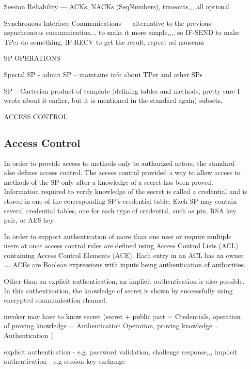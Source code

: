 \documentclass[
  digital, %
  oneside, %
  nolof,     %
  nolot,     %
]{fithesis4}
\begin{document}
Session Reliability --- ACKs, NACKs (SeqNumbers), timeouts,,, all optional

Synchronous Interface Communications --- alternative to the previous asynchronous communication... to make it more simple,,,, so IF-SEND to make TPer do something, IF-RECV to get the result, repeat ad nauseam


SP OPERATIONS

Special SP - admin SP -- maintains info about TPer and other SPs

SP -- Cartesian product of template (defining tables and methods, pretty sure I wrote about it earlier, but it is mentioned in the standard again) subsets, 

ACCESS CONTROL

\hline

\subsection{Access Control}

In order to provide access to methods only to authorized actors, the standard also defines access control. The access control provided a way to allow access to methods of the SP only after a knowledge of a secret has been proved. Information required to verify knowledge of the secret is called a credential and is stored in one of the corresponding SP's credential table. Each SP may contain several credential tables, one for each type of credential, such as pin, RSA key pair, or AES key.

In order to support authentication of more than one user or require multiple users at once access control rules are defined using Access Control Lists (ACL) containing Access Control Elements (ACE). Each entry in an ACL has an owner \dots. ACEs are Boolean expressions with inputs being authentication of authorities.

Other than an explicit authentication, an implicit authentication is also possible. In this authentication, the knowledge of secret is shown by successfully using encrypted communication channel.

\hline

invoker may have to know secret (secret + public part = Credentials, operation of proving knowledge = Authentication Operation, proving knowledge = Authentication )

explicit authentication - e.g. password validation, challenge response,,,
implicit authentication - e.g session key exchange
\end{document}
